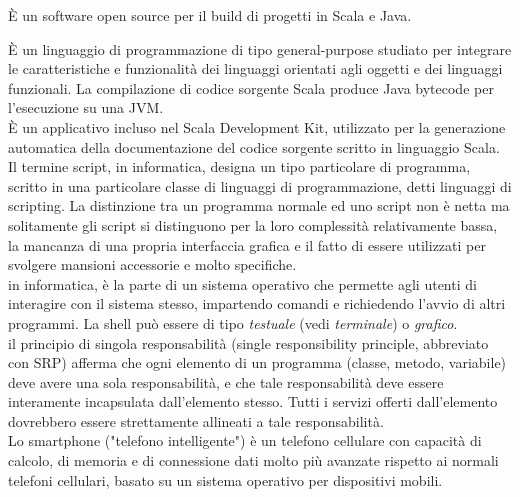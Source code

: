 \documentclass{scalatekids-article}
\begin{document}
  
   È un software open source per il build di progetti in Scala e Java.

   È un linguaggio di programmazione di tipo general-purpose studiato per integrare le caratteristiche e funzionalità dei linguaggi orientati agli oggetti e dei linguaggi funzionali. La compilazione di codice sorgente Scala produce Java bytecode per l'esecuzione su una JVM.
  \\

   È un applicativo incluso nel Scala Development Kit, utilizzato per la generazione automatica della documentazione del codice sorgente scritto in linguaggio Scala.
  \\

   Il termine script, in informatica, designa un tipo particolare di programma, scritto in una particolare classe di linguaggi di programmazione, detti linguaggi di scripting.
  La distinzione tra un programma normale ed uno script non è netta ma solitamente gli script si distinguono per la loro complessità relativamente bassa, la mancanza di una propria interfaccia grafica e il fatto di essere utilizzati per svolgere mansioni accessorie e molto specifiche.
  \\

   in informatica, è la parte di un sistema operativo che permette agli utenti di interagire con il sistema stesso, impartendo comandi e richiedendo l'avvio di altri programmi.
  La shell può essere di tipo \textit{testuale} (vedi \textit{terminale}) o \textit{grafico}.
  \\
  
   il principio di singola responsabilità (single responsibility principle, abbreviato con SRP) afferma che ogni elemento di un programma (classe, metodo, variabile) deve avere una sola responsabilità, e che tale responsabilità deve essere interamente incapsulata dall'elemento stesso. Tutti i servizi offerti dall'elemento dovrebbero essere strettamente allineati a tale responsabilità.
  \\
  
   Lo smartphone ("telefono intelligente") è un telefono cellulare con capacità di calcolo, di memoria e di connessione dati molto più avanzate rispetto ai normali telefoni cellulari, basato su un sistema operativo per dispositivi mobili.
  
\end{document}

